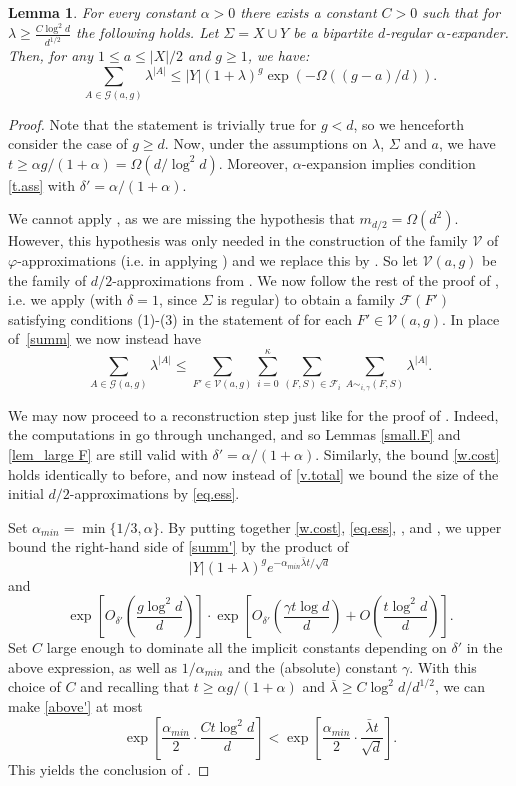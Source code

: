 \documentclass[a4paper]{amsart}
\newtheorem{lem}[thm]{Lemma}
\theoremstyle{definition}
\newcommand{\gl}{\lambda}
\newcommand{\cF}{\mathcal{F} }
\newcommand{\cG}{\mathcal{G} }
\newcommand{\cV}{\mathcal{V} }
\newcommand{\beq}[1]{\begin{equation}\label{#1}}
\newcommand{\enq}[0]{\end{equation}}
\newcommand{\0}[0]{\emptyset}
\newcommand{\lam}{\lambda}
\begin{document}
\begin{lem}\label{lem.algos}
    For every constant $\alpha>0$ there exists a constant $C>0$ such that for $\lam\geq \frac{C\log^2 d}{d^{1/2}}$ the following holds.
    Let $\Sigma=X\cup Y$ be a bipartite $d$-regular $\alpha$-expander. Then, for any $1\leq a\leq |X|/2$ and $g\geq 1$, we have:
    \[ \sum_{A\in \cG(a, g)} \lam^{|A|} \leq |Y|(1+\lam)^g \exp(-\Omega((g-a)/d)). \]
\end{lem}
\begin{proof}
Note that the statement is trivially true for $g<d$, so we henceforth consider the case of $g\geq d$. Now, under the assumptions on $\lam$, $\Sigma$ and $a$, we have $t\geq \alpha g/(1+\alpha) =\Omega(d/\log^2 d)$. Moreover, $\alpha$-expansion implies condition \eqref{t.ass} with $\delta'=\alpha/(1+\alpha)$.

We cannot apply , as we are missing the hypothesis that $m_{d/2}=\Omega(d^2)$. However, this hypothesis was only needed in the construction of the family $\cV$ of $\varphi$-approximations (i.e. in applying ) and we replace this by .  So let $\cV(a,g)$ be the family of $d/2$-approximations from .  We now follow the rest of the proof of , i.e. we apply  (with $\delta=1$, since $\Sigma$ is regular) to obtain a family $\cF(F')$ satisfying conditions (1)-(3) in the statement of  for each $F'\in\cV(a,g)$. In place of~\eqref{summ} we now instead have
\beq{summ'}\sum_{A \in \cG(a,g)} \gl^{|A|} \le \sum_{F' \in \cV(a,g)} \sum_{i=0}^\kappa \sum_{(F,S) \in \cF_i} \sum_{A \sim_{i, \gamma} (F,S)}\gl^{|A|}.\enq

We may now proceed to a reconstruction step just like for the proof of . Indeed, the computations in  go through unchanged, and so Lemmas \ref{small.F} and \ref{lem_large F} are still valid with $\delta'=\alpha/(1+\alpha)$. Similarly, the bound \eqref{w.cost} holds identically to before, and now instead of \eqref{v.total} we bound the size of the initial $d/2$-approximations by \eqref{eq.ess}.

Set $\alpha_{min}=\min\{1/3, \alpha\}$. By putting together \eqref{w.cost}, \eqref{eq.ess}, , and , we upper bound the right-hand side of \eqref{summ'} by the product of \[|Y|(1+\gl)^ge^{-\alpha_{min} \bar\gl t/\sqrt{d}}\] and
\beq{above'}\exp\left[O_{\delta'}\left(\frac{g\log^2 d}{d}\right)\right]\cdot \exp\left[O_{\delta'}\left(\frac{\gamma t\log d}{d}\right)+O\left(\frac{t\log^2 d}{d}\right)\right].\enq
Set $C$ large enough to dominate all the implicit constants depending on $\delta'$ in the above expression, as well as $1/\alpha_{min}$ and the (absolute) constant $\gamma$. With this choice of $C$ and recalling that $t\geq \alpha g/(1+\alpha)$ and $\bar\lam\geq C\log^2 d/d^{1/2}$, we can make \eqref{above'} at most
\[\exp\left[\frac{\alpha_{min}}{2}\cdot \frac{Ct\log^2 d}{d}\right]<\exp\left[\frac{\alpha_{min}}{2}\cdot\frac{\bar\gl t}{\sqrt{d}}\right].\]
This yields the conclusion of .
\end{proof}
\end{document}
